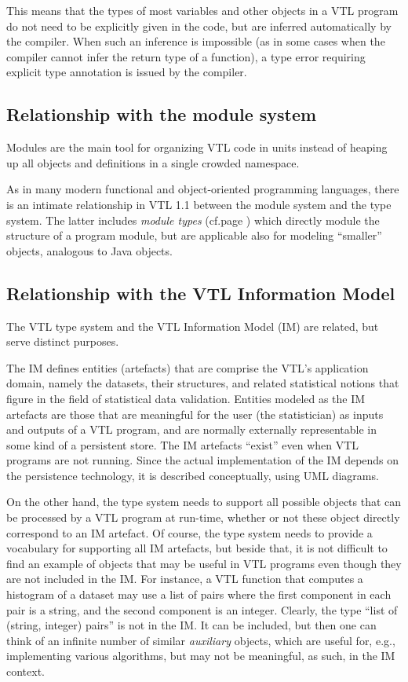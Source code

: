 \documentclass[droidmono,libertine,twoside,user,unofficial]{ecarticle}
\begin{document}
This means that the types of most variables and other objects in a VTL
program do not need to be explicitly given in the code, but are
inferred automatically by the compiler.  When such an inference is
impossible (as in some cases when the compiler cannot infer the return
type of a function), a type error requiring explicit type annotation
is issued by the compiler.


\subsection{Relationship with the module system}
\label{sec:relat-module-syst}

Modules are the main tool for organizing VTL code in units instead of
heaping up all objects and definitions in a single crowded namespace.

As in many modern functional and object-oriented programming
languages, there is an intimate relationship in VTL 1.1 between the
module system and the type system.  The latter includes \emph{module
  types} (cf.\@ page \pageref{sec:module-types}) which directly module
the structure of a program module, but are applicable also for
modeling ``smaller'' objects, analogous to Java objects.


\subsection{Relationship with the VTL Information Model}

The VTL type system and the VTL Information Model (IM) are related,
but serve distinct purposes.

The IM defines entities (artefacts) that are comprise the VTL's
application domain, namely the datasets, their structures, and related
statistical notions that figure in the field of statistical data
validation.  Entities modeled as the IM artefacts are those that are
meaningful for the user (the statistician) as inputs and outputs of a
VTL program, and are normally externally representable in some kind of
a persistent store.  The IM artefacts ``exist'' even when VTL programs
are not running.  Since the actual implementation of the IM depends on
the persistence technology, it is described conceptually, using UML
diagrams.

On the other hand, the type system needs to support all possible
objects that can be processed by a VTL program at run-time, whether or
not these object directly correspond to an IM artefact.  Of course,
the type system needs to provide a vocabulary for supporting all IM
artefacts, but beside that, it is not difficult to find an example of
objects that may be useful in VTL programs even though they are not
included in the IM.
%
For instance, a VTL function that computes a histogram of a dataset
may use a list of pairs where the first component in each pair is a
string, and the second component is an integer.  Clearly, the type
``list of (string, integer) pairs'' is not in the IM.  It can be
included, but then one can think of an infinite number of similar
\emph{auxiliary} objects, which are useful for, e.g., implementing
various algorithms, but may not be meaningful, as such, in the IM
context.
\end{document}
